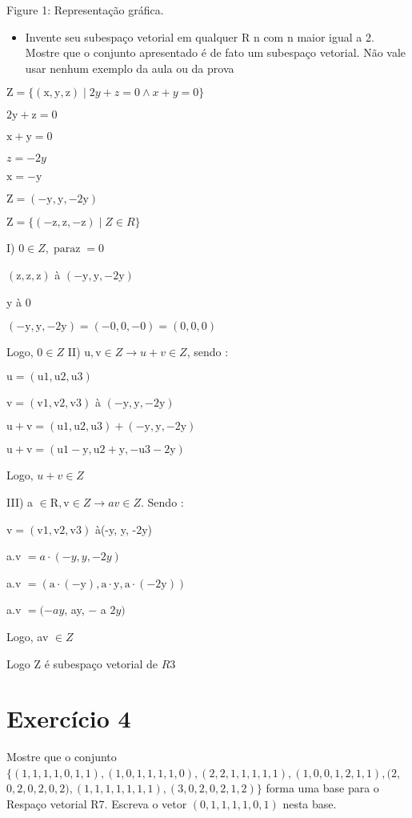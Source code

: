 \documentclass[10pt]{article}
\begin{document}
Figure 1: Representação gráfica.

\begin{itemize}
  \item Invente seu subespaço vetorial em qualquer $\mathrm{R}$ n com $\mathrm{n}$ maior igual a 2. Mostre que o conjunto apresentado é de fato um subespaço vetorial. Não vale usar nenhum exemplo da aula ou da prova
\end{itemize}
$\mathrm{Z}=\{(\mathrm{x}, \mathrm{y}, \mathrm{z}) \mid 2 y+z=0 \wedge x+y=0\}$

$2 \mathrm{y}+\mathrm{z}=0$

$\mathrm{x}+\mathrm{y}=0$

$z=-2 y$

$\mathrm{x}=-\mathrm{y}$

$\mathrm{Z}=(-\mathrm{y}, \mathrm{y},-2 \mathrm{y})$

$\mathrm{Z}=\{(-\mathrm{z}, \mathrm{z},-\mathrm{z}) \mid Z \in R\}$

I) $0 \in Z, \operatorname{paraz}=0$

$(\mathrm{z}, \mathrm{z}, \mathrm{z})$ à $(-\mathrm{y}, \mathrm{y},-2 \mathrm{y})$

y à 0

$(-\mathrm{y}, \mathrm{y},-2 \mathrm{y})=(-0,0,-0)=(0,0,0)$

Logo, $0 \in Z$ II) $\mathrm{u}, \mathrm{v} \in Z \rightarrow u+v \in Z$, sendo :

$\mathrm{u}=(\mathrm{u} 1, \mathrm{u} 2, \mathrm{u} 3)$

$\mathrm{v}=(\mathrm{v} 1, \mathrm{v} 2, \mathrm{v} 3)$ à $(-\mathrm{y}, \mathrm{y},-2 \mathrm{y})$

$\mathrm{u}+\mathrm{v}=(\mathrm{u} 1, \mathrm{u} 2, \mathrm{u} 3)+(-\mathrm{y}, \mathrm{y},-2 \mathrm{y})$

$\mathrm{u}+\mathrm{v}=(\mathrm{u} 1-\mathrm{y}, \mathrm{u} 2+\mathrm{y},-\mathrm{u} 3-2 \mathrm{y})$

Logo, $u+v \in Z$

III) a $\in \mathrm{R}, \mathrm{v} \in Z \rightarrow a v \in Z$. Sendo :

$\mathrm{v}=(\mathrm{v} 1, \mathrm{v} 2, \mathrm{v} 3)$ à(-y, y, -2y)

a.v $=a \cdot(-y, y,-2 y)$

a.v $=(\mathrm{a} \cdot(-\mathrm{y}), \mathrm{a} \cdot \mathrm{y}, \mathrm{a} \cdot(-2 \mathrm{y}))$

a.v $=(-a y$, ay, $-$ a $2 y)$

Logo, av $\in Z$

Logo Z é subespaço vetorial de $R 3$

\section{Exercício 4}
Mostre que o conjunto $\{(1,1,1,1,0,1,1),(1,0,1,1,1,1,0),(2,2,1,1,1,1,1),(1,0,0,1,2,1,1),(2$, $0,2,0,2,0,2),(1,1,1,1,1,1,1),(3,0,2,0,2,1,2)\}$ forma uma base para o Respaço vetorial R7. Escreva o vetor $(0,1,1,1,1,0,1)$ nesta base.
\end{document}
